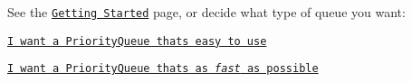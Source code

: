 See the \href{https://github.com/BlueRaja/High-Speed-Priority-Queue-for-C-Sharp/wiki/Getting-Started}{\tt Getting Started} page, or decide what type of queue you want\+:


\begin{DoxyItemize}
\item \href{https://github.com/BlueRaja/High-Speed-Priority-Queue-for-C-Sharp/wiki/Using-the-SimplePriorityQueue}{\tt I want a Priority\+Queue that\textquotesingle{}s easy to use}
\item \href{https://github.com/BlueRaja/High-Speed-Priority-Queue-for-C-Sharp/wiki/Using-the-FastPriorityQueue}{\tt I want a Priority\+Queue that\textquotesingle{}s as {\itshape fast} as possible} 
\end{DoxyItemize}